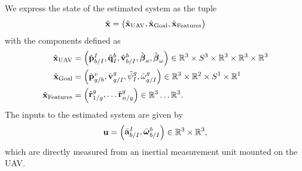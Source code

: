 
We express the state of the estimated system as the tuple
\begin{equation*}
  \hat{\boldsymbol{\mathrm{x}}} =
  \begin{pmatrix}
    \hat{\boldsymbol{\mathrm{x}}}_{\text{UAV}}, \hat{\boldsymbol{\mathrm{x}}}_{\text{Goal}}, \hat{\boldsymbol{\mathrm{x}}}_{\text{Features}}
  \end{pmatrix}
\end{equation*}
with the components defined as
\begin{align*}
  \hat{\boldsymbol{\mathrm{x}}}_{\text{UAV}} &=
  \begin{pmatrix}
    \hat{\boldsymbol{\mathrm{p}}}_{b/I}^{I}, \hat{\boldsymbol{\mathrm{q}}}_I^{b}, \hat{\boldsymbol{\mathrm{v}}}_{b/I}^b,
    \hat{\boldsymbol{\mathrm{\beta}}}_a,
    \hat{\boldsymbol{\mathrm{\beta}}}_{\omega}
  \end{pmatrix}
    \in \mathbb{R}^3 \times S^3 \times \mathbb{R}^3 \times \mathbb{R}^3 \times
    \mathbb{R}^3  \\
    \hat{\boldsymbol{\mathrm{x}}}_{\text{Goal}} & =
    \begin{pmatrix}
      \hat{\boldsymbol{\mathrm{p}}}_{g/b}^{v}, \hat{\boldsymbol{\mathrm{v}}}_{g/I}^{g}, \hat{\psi}_{I}^{g},
      \hat{\omega}_{g/I}^{g}
    \end{pmatrix}
    \in \mathbb{R}^3 \times \mathbb{R}^2 \times S^1 \times \mathbb{R}^1
    \\
    \hat{\boldsymbol{\mathrm{x}}}_{\text{Features}} & =
    \begin{pmatrix}
      \hat{\boldsymbol{\mathrm{r}}}_{1/g}^{g}, \dots \hat{\boldsymbol{\mathrm{r}}}_{n/g}^{g}
    \end{pmatrix}
    \in \mathbb{R}^3 \dots \mathbb{R}^3.
\end{align*}
The inputs to the estimated system are given by
\begin{equation*}
  \boldsymbol{\mathrm{u}} = \begin{pmatrix} \bar{\boldsymbol{\mathrm{a}}}_{b/I}^I, \bar{\boldsymbol{\mathrm{\omega}}}_{b/I}^b \end{pmatrix} \in
        \mathbb{R}^3 \times \mathbb{R}^3,
\end{equation*}
which are directly measured from an inertial measurement unit mounted on the UAV.

